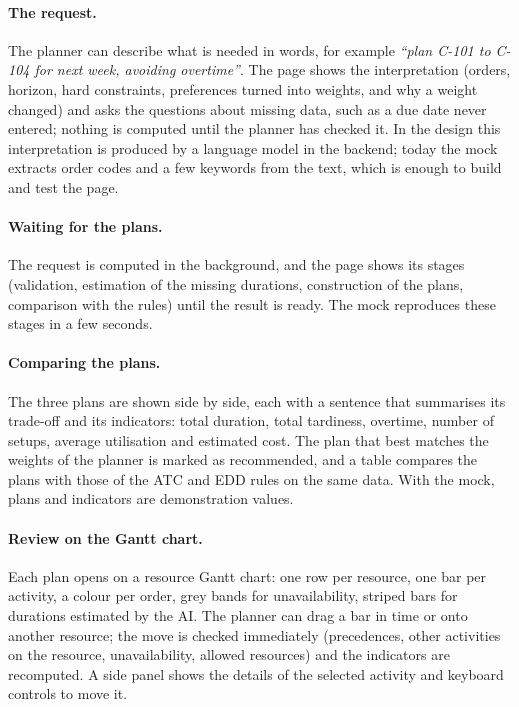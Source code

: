 \paragraph{The request.} The planner can describe what is needed in words, for example
\emph{``plan C-101 to C-104 for next week, avoiding overtime''}. The page shows the
interpretation (orders, horizon, hard constraints, preferences turned into weights, and why a
weight changed) and asks the questions about missing data, such as a due date never entered;
nothing is computed until the planner has checked it. In the design this interpretation is
produced by a language model in the backend; today the mock extracts order codes and a few
keywords from the text, which is enough to build and test the page.

\paragraph{Waiting for the plans.} The request is computed in the background, and the page shows
its stages (validation, estimation of the missing durations, construction of the plans,
comparison with the rules) until the result is ready. The mock reproduces these stages in a few
seconds.

\paragraph{Comparing the plans.} The three plans are shown side by side, each with a sentence
that summarises its trade-off and its indicators: total duration, total tardiness, overtime,
number of setups, average utilisation and estimated cost. The plan that best matches the weights
of the planner is marked as recommended, and a table compares the plans with those of the ATC
and EDD rules on the same data. With the mock, plans and indicators are demonstration values.

\paragraph{Review on the Gantt chart.} Each plan opens on a resource Gantt chart: one row per
resource, one bar per activity, a colour per order, grey bands for unavailability, striped bars
for durations estimated by the AI. The planner can drag a bar in time or onto another resource;
the move is checked immediately (precedences, other activities on the resource, unavailability,
allowed resources) and the indicators are recomputed. A side panel shows the details of the
selected activity and keyboard controls to move it.

